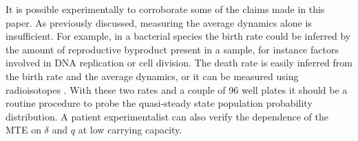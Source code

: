 It is possible experimentally to corroborate some of the claims made in this paper.
As previously discussed, measuring the average dynamics alone is insufficient. 
For example, in a bacterial species the birth rate could be inferred by the amount of reproductive byproduct present in a sample, for instance factors involved in DNA replication or cell division. %
The death rate is easily inferred from the birth rate and the average dynamics, or it can be measured using radioisotopes \cite{Servais1985}. %
With these two rates and a couple of 96 well plates it should be a routine procedure to probe the quasi-steady state population probability distribution. 
A patient experimentalist can also verify the dependence of the MTE on $\delta$ and $q$ at low carrying capacity. 

